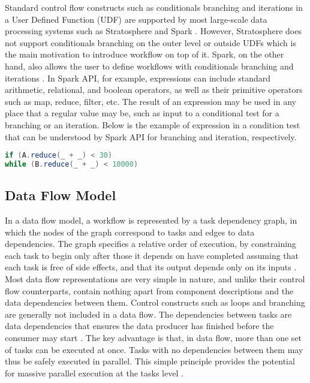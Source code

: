 Standard control flow constructs such as conditionals branching and iterations in a User Defined Function (UDF) are supported by most large-scale data processing systems such as Stratosphere \cite{alexandrov2011mapreduce} and Spark \cite{zaharia2010spark}. However, Stratosphere does not support conditionals branching on the outer level or outside UDFs which is the main motivation to introduce workflow on top of it. Spark, on the other hand, also allows the user to define workflows with conditionals branching and iterations \cite{zaharia2012resilient}. In Spark API, for example, expressions can include standard arithmetic, relational, and boolean operators, as well as their primitive operators such as map, reduce, filter, etc. The result of an expression may be used in any place that a regular value may be, such as input to a conditional test for a branching or an iteration. Below is the example of expression in a condition test that can be understood by Spark API for branching and iteration, respectively.
\begin{lstlisting}[language=scala, label = controlflow]
if (A.reduce(_ + _) < 30)
while (B.reduce(_ + _) < 10000)
\end{lstlisting} 
\subsection{Data Flow Model}

In a data flow model, a workflow is represented by a task dependency graph, in which the nodes of the graph correspond to tasks and edges to data dependencies. The graph specifies a relative order of execution, by constraining each task to begin only after those it depends on have completed assuming that each task is free of side effects, and that its output depends only on its inputs \cite{kelly2011applying}. Most data flow representations are very simple in nature, and unlike their control flow counterparts, contain nothing apart from component descriptions and the data dependencies between them. Control constructs such as loops and branching are generally not included in a data flow. The dependencies between tasks are data dependencies that ensures the data producer has finished before the consumer may start \cite{deelman2009workflows}. The key advantage is that, in data flow, more than one set of tasks can be executed at once. Tasks with no dependencies between them may thus be safely executed in parallel. This simple principle provides the potential for massive parallel execution at the tasks level \cite{johnston2004advances}.

